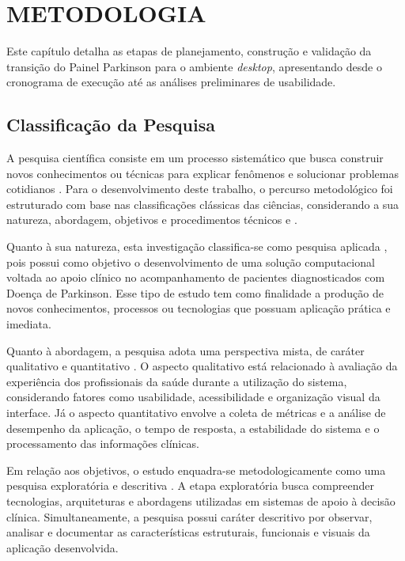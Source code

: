 
\chapter{METODOLOGIA}
\label{chap:metodologia}

Este capítulo detalha as etapas de planejamento, construção e validação da transição do Painel Parkinson para o ambiente \textit{desktop}, apresentando desde o cronograma de execução até as análises preliminares de usabilidade.

\section{Classificação da Pesquisa}
\label{sec:classificacao_pesquisa}

A pesquisa científica consiste em um processo sistemático que busca construir novos conhecimentos ou técnicas para explicar fenômenos e solucionar problemas cotidianos \cite{santos2021metodologia}. Para o desenvolvimento deste trabalho, o percurso metodológico foi estruturado com base nas classificações clássicas das ciências, considerando a sua natureza, abordagem, objetivos e procedimentos técnicos \cite{fonseca2023tipos} e \cite{santos2021metodologia}.

Quanto à sua natureza, esta investigação classifica-se como pesquisa aplicada \cite{santos2021metodologia}, pois possui como objetivo o desenvolvimento de uma solução computacional voltada ao apoio clínico no acompanhamento de pacientes diagnosticados com Doença de Parkinson. Esse tipo de estudo tem como finalidade a produção de novos conhecimentos, processos ou tecnologias que possuam aplicação prática e imediata.

Quanto à abordagem, a pesquisa adota uma perspectiva mista, de caráter qualitativo e quantitativo \cite{santos2021metodologia}. O aspecto qualitativo está relacionado à avaliação da experiência dos profissionais da saúde durante a utilização do sistema, considerando fatores como usabilidade, acessibilidade e organização visual da interface. Já o aspecto quantitativo envolve a coleta de métricas e a análise de desempenho da aplicação, o tempo de resposta, a estabilidade do sistema e o processamento das informações clínicas.

Em relação aos objetivos, o estudo enquadra-se metodologicamente como uma pesquisa exploratória e descritiva \cite{santos2021metodologia}. A etapa exploratória busca compreender tecnologias, arquiteturas e abordagens utilizadas em sistemas de apoio à decisão clínica. Simultaneamente, a pesquisa possui caráter descritivo por observar, analisar e documentar as características estruturais, funcionais e visuais da aplicação desenvolvida.

